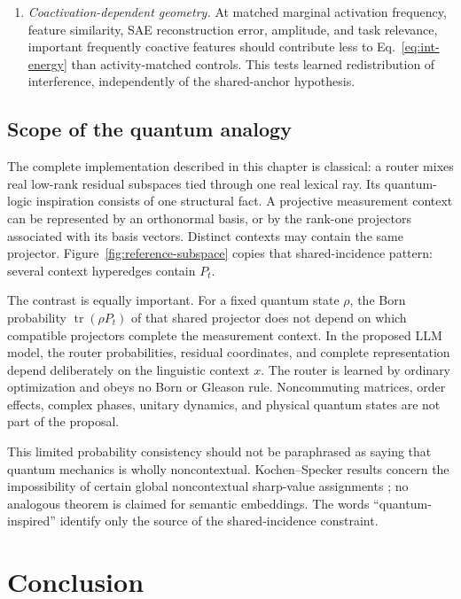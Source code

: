 \documentclass[
  aps,
  reprint,
  superscriptaddress,
  floatfix,
  nofootinbib,
  longbibliography
]{revtex4-2}
\begin{document}
\begin{enumerate}
\item \emph{Coactivation-dependent geometry.}
At matched marginal activation frequency, feature similarity, SAE
reconstruction error, amplitude, and task relevance, important frequently
coactive features should contribute less to Eq.~\eqref{eq:int-energy} than
activity-matched controls.  This tests learned redistribution of interference,
independently of the shared-anchor hypothesis.
\end{enumerate}

\subsection{Scope of the quantum analogy}
\label{sec:quantum}

The complete implementation described in this chapter is classical: a router
mixes real low-rank residual subspaces tied through one real lexical ray.  Its
quantum-logic inspiration consists of one structural fact.  A projective
measurement context can be represented by an orthonormal basis, or by the
rank-one projectors associated with its basis vectors.  Distinct contexts may
contain the same projector.  Figure~\ref{fig:reference-subspace} copies that
shared-incidence pattern: several context hyperedges contain $P_t$.

The contrast is equally important.  For a fixed quantum state $\rho$, the Born
probability $\operatorname{tr}(\rho P_t)$ of that shared projector does not
depend on which compatible projectors complete the measurement context.  In
the proposed LLM model, the router probabilities, residual coordinates, and
complete representation depend deliberately on the linguistic context $x$.
The router is learned by ordinary optimization and obeys no Born or Gleason
rule.  Noncommuting matrices, order effects, complex phases, unitary dynamics,
and physical quantum states are not part of the proposal.

This limited probability consistency should not be paraphrased as saying that
quantum mechanics is wholly noncontextual.  Kochen--Specker results concern the
impossibility of certain global noncontextual sharp-value assignments
\cite{specker-60,kochen1}; no analogous theorem is claimed for semantic
embeddings.  The words ``quantum-inspired'' identify only the source of the
shared-incidence constraint.

\section{Conclusion}
\label{sec:conclusion}
\end{document}
